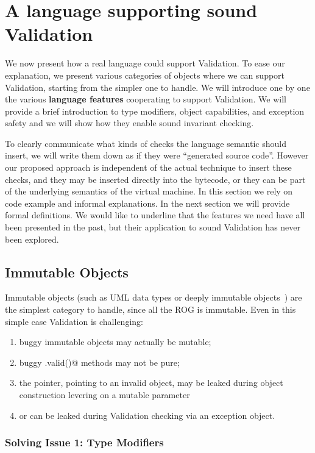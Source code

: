 \saveSpace
\section{A language supporting sound Validation}
\label{s:language}
\saveSpace
We now present how a real language could support
Validation. To ease our explanation, we present various categories
of objects where we can support Validation, starting from the simpler one to handle.
We will introduce one by one the various
\textbf{language features} cooperating
to support Validation.%
We will provide a brief introduction to type modifiers, object capabilities, and exception safety and we will show how they enable sound invariant checking.

To clearly communicate what kinds of checks the language semantic should insert,
 we will write them down as if they were ``generated source code''. 
However our proposed approach is independent of the actual technique to insert these checks, and they may be inserted directly into the bytecode, or they can be part of the underlying semantics of the virtual machine.
In this section we rely on code example and informal explanations. In the next section we will provide formal definitions.
We would like to underline that the
features we need have all been presented in the past, but their application to sound Validation has never been explored.
\saveSpace
\subsection{Immutable Objects}
\label{s:immutable}
\saveSpace
Immutable objects (such as UML data types or deeply immutable objects~\cite{Potanin2013}) are the simplest category to handle, since all the ROG is immutable.
Even in this simple case Validation is challenging:
\begin{enumerate}
  \item buggy immutable objects may actually be mutable;
  \item buggy \Q@.valid()@ methods may not be pure;
  \item the \Q@this@ pointer, pointing to an invalid object, may be leaked during object
 construction levering on a mutable parameter
\item or can be leaked during Validation checking via an exception object.
\end{enumerate}

\subsubsection*{Solving Issue 1: Type Modifiers}

